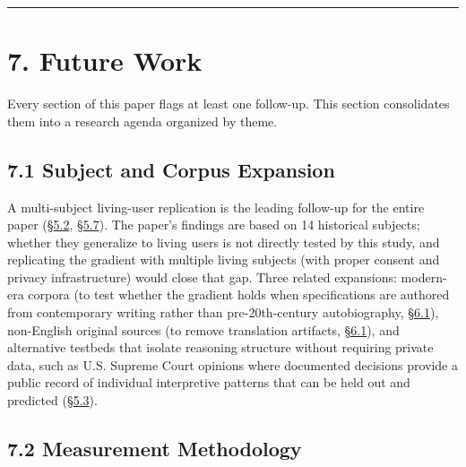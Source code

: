 \begin{center}\rule{0.5\linewidth}{0.5pt}\end{center}

\hypertarget{future-work}{%
\section{7. Future Work}\label{future-work}}

Every section of this paper flags at least one follow-up. This section
consolidates them into a research agenda organized by theme.

\hypertarget{subject-and-corpus-expansion}{%
\subsection{7.1 Subject and Corpus
Expansion}\label{subject-and-corpus-expansion}}

A multi-subject living-user replication is the leading follow-up for the
entire paper (\hyperref[why-the-gradient-is-the-load-bearing-finding]{§5.2}, \hyperref[privacy-and-the-case-for-user-held-representation]{§5.7}). The paper's findings are based on 14
historical subjects; whether they generalize to living users is not
directly tested by this study, and replicating the gradient with
multiple living subjects (with proper consent and privacy
infrastructure) would close that gap. Three related expansions:
modern-era corpora (to test whether the gradient holds when
specifications are authored from contemporary writing rather than
pre-20th-century autobiography, \hyperref[subject-sample]{§6.1}), non-English original sources (to
remove translation artifacts, \hyperref[subject-sample]{§6.1}), and alternative testbeds that
isolate reasoning structure without requiring private data, such as U.S.
Supreme Court opinions where documented decisions provide a public
record of individual interpretive patterns that can be held out and
predicted (\hyperref[retrieval-is-not-interpretation]{§5.3}).

\hypertarget{measurement-methodology}{%
\subsection{7.2 Measurement Methodology}\label{measurement-methodology}}

